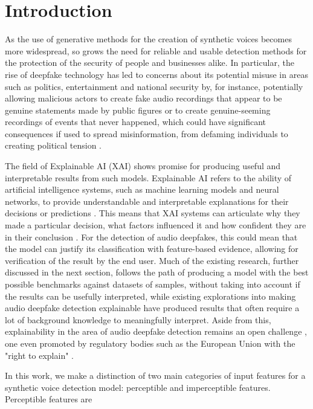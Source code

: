 \documentclass{article}
\begin{document}
    \section{Introduction}
    As the use of generative methods for the creation of synthetic voices becomes more widespread,
    so grows the need for reliable and usable detection methods for the protection of the security
    of people and businesses alike. In particular, the rise of deepfake technology has led to
	concerns about its potential misuse in areas such as politics, entertainment and national
	security by, for instance, potentially allowing malicious actors to create fake audio
	recordings that appear to be genuine statements made by public figures or to create
	genuine-seeming recordings of events that never happened, which could have significant
	consequences if used to spread misinformation, from defaming individuals to creating political
	tension \cite{veerasamy_rising_2022,albahar_deepfakes_2005}.
	\par
	The field of Explainable AI (XAI) shows promise for producing useful and interpretable results
	from such models. Explainable AI refers to the ability of artificial intelligence systems,
	such as machine learning models and neural networks, to provide understandable and
	interpretable explanations for their decisions or predictions \cite{hind_explaining_2019}.
	This means that XAI systems can articulate why they made a particular decision, what factors
	influenced it and how confident they are in their conclusion \cite{hind_explaining_2019}. For
	the detection of audio deepfakes, this could mean that the model can justify its
	classification with feature-based evidence, allowing for verification of the result by the end
	user. Much of the existing research, further discussed in the next section, follows the path
	of producing a model with the best possible benchmarks against datasets of samples, without
	taking into account if the results can be usefully interpreted, while existing explorations
	into making audio deepfake detection explainable have produced results that often require a
	lot of background knowledge to meaningfully interpret. Aside from this, explainability in the
	area of audio deepfake detection remains an open challenge \cite{cuccovillo_open_2022}, one
	even promoted by regulatory bodies such as the European Union with the "right to explain"
	\cite{goodman_european_2017}.
	\par
	In this work, we make a distinction of two main categories of input features for a synthetic
	voice detection model: perceptible and imperceptible features. Perceptible features are
\end{document}
